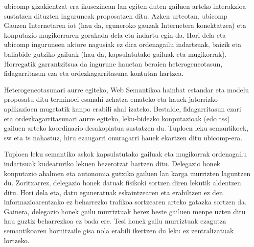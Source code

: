 \begin{resumen}
\end{resumen}



\begin{laburpena}        %
\acf{ubicomp} gizakientzat era ikusezinean lan egiten duten gailuen arteko interakzioa sustatzen dituzten inguruneak proposatzen ditu. %
Azken urteotan, \ac{ubicomp} Gauzen Internetaren \acs{iot} (hau da, eguneroko gauzak Internetera konektatzea) eta konputazio mugikorraren gorakada dela eta indartu egin da.
Hori dela eta \ac{ubicomp} inguruneen aktore nagusiak ez dira ordenagailu indartsuak, baizik eta baliabide gutziko gailuak (hau da, kapsulatutako gailuak eta mugikorrak). %
Horregatik garrantzitsua da ingurune hauetan beraien heterogeneotasun, fidagarritasun eza eta ordezkagarritasuna kontutan hartzea.


Heterogeneotasunari aurre egiteko, Web Semantikoa hainbat estandar eta modelu proposatu ditu terminoei esanahi zehatza emateko eta hauek jatorrizko aplikazioen mugetatik kanpo erabili ahal izateko.
Bestalde, fidagarritasun ezari eta ordezkagarritasunari aurre egiteko, leku-bidezko konputazioak (edo \aclp{ts}) gailuen arteko koordinazio desakoplatua sustatzen du. %
Tuploen leku semantikoek, \acl{sw} eta \acl{ts} nahastuz, hiru ezaugarri onuragarri hauek ekartzen ditu \ac{ubicomp}-era.


Tuploen leku semantiko askok kapsulatutako gailuak eta mugikorrak ordenagailu indartsuak kudeaturiko lekuen bezerotzat hartzen ditu. %
Delegazio honek konputazio ahalmen eta autonomia gutxiko gailuen lan karga murrizten laguntzen du. %
Zoritxarrez, delegazio honek datuak fisikoki sortzen diren lekutik aldentzen ditu.
Hori dela eta, datu eguneratuak eskaintzearen eta erabiltzen ez den informazioarentzako ez beharrezko trafikoa sortzearen arteko gatazka sortzen da.
Gainera, delegazio honek gailu murriztuak berez beste gailuen menpe uzten ditu hau guztiz beharrezkoa ez bada ere. %
Tesi honek gailu murriztuak ezagutza semantikoaren hornitzaile gisa nola erabili ikertzen du leku ez zentralizatuak lortzeko. %



\end{laburpena}

